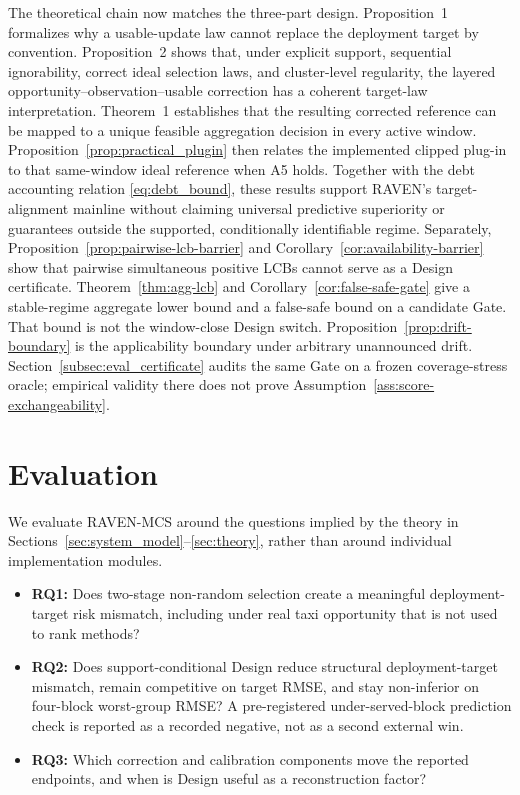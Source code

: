 \documentclass[letterpaper,journal]{IEEEtran}
\begin{document}
The theoretical chain now matches the three-part design.  Proposition~1
formalizes why a usable-update law cannot replace the deployment target by
convention.  Proposition~2 shows that, under explicit support, sequential
ignorability, correct ideal selection laws, and cluster-level regularity, the
layered opportunity--observation--usable correction has a coherent target-law
interpretation.  Theorem~1 establishes that the resulting corrected reference
can be mapped to a unique feasible aggregation decision in every active window.
Proposition~\ref{prop:practical_plugin} then relates the implemented
clipped plug-in to that same-window ideal reference when A5 holds.
Together with the debt accounting relation
\eqref{eq:debt_bound}, these results support RAVEN's target-alignment mainline
without claiming universal predictive superiority or guarantees outside the
supported, conditionally identifiable regime.  Separately,
Proposition~\ref{prop:pairwise-lcb-barrier} and
Corollary~\ref{cor:availability-barrier} show that pairwise simultaneous
positive LCBs cannot serve as a Design certificate.
Theorem~\ref{thm:agg-lcb} and Corollary~\ref{cor:false-safe-gate} give a
stable-regime aggregate lower bound and a false-safe bound on a candidate
Gate.  That bound is not the window-close Design switch.
Proposition~\ref{prop:drift-boundary} is the applicability boundary under
arbitrary unannounced drift.  Section~\ref{subsec:eval_certificate}
audits the same Gate on a frozen coverage-stress oracle; empirical
validity there does not prove Assumption~\ref{ass:score-exchangeability}.




\section{Evaluation}
\label{sec:evaluation}

We evaluate RAVEN-MCS around the questions implied by the theory in
Sections~\ref{sec:system_model}--\ref{sec:theory}, rather than around individual
implementation modules.

\begin{itemize}
    \item \textbf{RQ1:} Does two-stage non-random selection create a meaningful
    deployment-target risk mismatch, including under real taxi opportunity
    that is not used to rank methods?
    \item \textbf{RQ2:} Does support-conditional Design reduce
    structural deployment-target mismatch, remain competitive on
    target RMSE, and stay non-inferior on four-block worst-group RMSE?
    A pre-registered under-served-block prediction check is reported
    as a recorded negative, not as a second external win.
    \item \textbf{RQ3:} Which correction and calibration components move
    the reported endpoints, and when is Design useful as a reconstruction
    factor?
\end{itemize}
\end{document}
